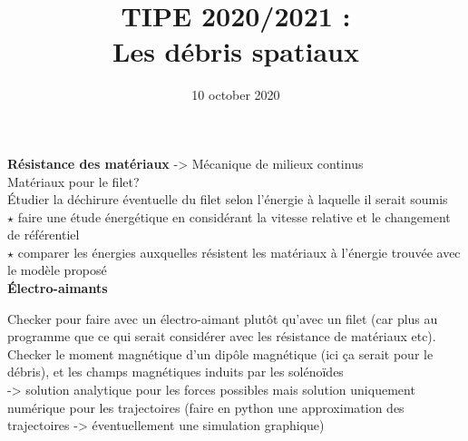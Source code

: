 \documentclass[a4paper,1pt]{article}
\title{TIPE 2020/2021 : \\ Les débris spatiaux}
\date{10 october 2020}
\begin{document}
\maketitle
\textbf{Résistance des matériaux}
-> Mécanique de milieux continus\\
Matériaux pour le filet?\\

Étudier la déchirure éventuelle du filet selon l'énergie à laquelle il serait soumis\\
$\star$ faire une étude énergétique en considérant la vitesse relative et le changement de référentiel\\
$\star$ comparer les énergies auxquelles résistent les matériaux à l'énergie trouvée avec le modèle proposé  \\

\textbf{Électro-aimants}

Checker pour faire avec un électro-aimant plutôt qu'avec un filet (car plus au programme que ce qui serait considérer avec les résistance de matériaux etc).\\

Checker le moment magnétique d'un dipôle magnétique (ici ça serait pour le débris), et les champs magnétiques induits par les solénoïdes\\
-> solution analytique pour les forces possibles mais solution uniquement numérique pour les trajectoires (faire en python une approximation des trajectoires -> éventuellement une simulation graphique)
\end{document}
